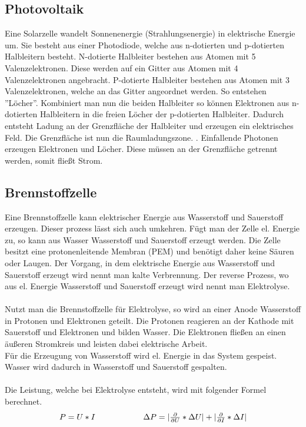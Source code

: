 \documentclass[12pt,a4paper,twoside]{article}
\begin{document}
\subsection{Photovoltaik}
Eine Solarzelle wandelt Sonnenenergie (Strahlungsenergie) in elektrische Energie um. Sie besteht aus einer Photodiode, welche aus n-dotierten und p-dotierten Halbleitern besteht. 
N-dotierte Halbleiter bestehen aus Atomen mit 5 Valenzelektronen. Diese werden auf ein Gitter aus Atomen mit 4 Valenzelektronen angebracht. 
P-dotierte Halbleiter bestehen aus Atomen mit 3 Valenzelektronen, welche an das Gitter angeordnet werden. So entstehen ''Löcher''. Kombiniert man nun die beiden Halbleiter so können Elektronen aus n-dotierten Halbleitern in die freien Löcher der p-dotierten Halbleiter. 
Dadurch entsteht Ladung an der Grenzfläche der Halbleiter und erzeugen ein elektrisches Feld. Die Grenzfläche ist nun die Raumladungszone. . 
Einfallende Photonen erzeugen Elektronen und Löcher. Diese müssen an der Grenzfläche getrennt werden, somit fließt Strom. 

\subsection{Brennstoffzelle}
Eine Brennstoffzelle kann elektrischer Energie aus Wasserstoff und Sauerstoff erzeugen. 
Dieser prozess lässt sich auch umkehren. Fügt man der Zelle el. Energie zu, so kann aus Wasser Wasserstoff und Sauerstoff erzeugt werden. 
Die Zelle besitzt eine protonenleitende Membran (PEM) und benötigt daher keine Säuren oder Laugen. 
Der Vorgang, in dem elektrische Energie aus Wasserstoff und Sauerstoff erzeugt wird nennt man kalte Verbrennung. Der reverse Prozess, wo aus el. Energie Wasserstoff und Sauerstoff erzeugt wird nennt man Elektrolyse. 
\\
\\ 
Nutzt man die Brennstoffzelle für Elektrolyse, so wird an einer Anode Wasserstoff in Protonen und Elektronen geteilt. Die Protonen reagieren an der Kathode mit Sauerstoff und Elektronen und bilden Wasser. Die Elektronen fließen an einen äußeren Stromkreis und leisten dabei elektrische Arbeit. 
\\
Für die Erzeugung von Wasserstoff wird el. Energie in das System gespeist. Wasser wird dadurch in Wasserstoff und Sauerstoff gespalten. 
\\
\\
Die Leistung, welche bei Elektrolyse entsteht, wird mit folgender Formel berechnet. 
\begin{equation}
    \label{eq:leistung}
    \centerline{$P = U*I$  \\ $\Delta P = \vert \frac{\partial }{\partial U} * \Delta U \vert + \vert \frac{\partial }{\partial I} * \Delta I \vert$}
\end{equation}
\end{document}
